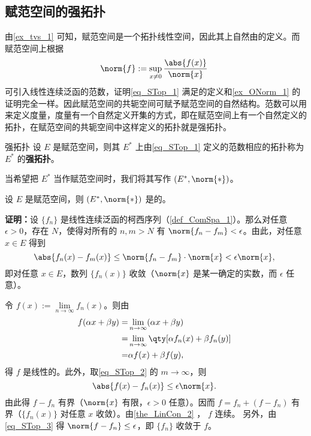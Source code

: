 
\subsection{赋范空间的强拓扑}

由\autoref{ex_tvs_1} 可知，赋范空间是一个拓扑线性空间，因此其上自然由的定义。而赋范空间上根据
\begin{equation}\label{eq_STop_1}
\norm{f}:=\sup_{x\neq0}\frac{\abs{f(x)}}{\norm{x}}~
\end{equation}
可引入线性连续泛函的范数，证明\autoref{eq_STop_1} 满足的定义和\autoref{ex_ONorm_1} 的证明完全一样。因此赋范空间的共轭空间可赋予赋范空间的自然结构。范数可以用来定义度量，度量有一个自然定义开集的方式，即在赋范空间上有一个自然定义的拓扑，在赋范空间的共轭空间中这样定义的拓扑就是强拓扑。
\begin{definition}{强拓扑}
设 $E$ 是赋范空间，则其 $E^*$ 上由\autoref{eq_STop_1} 定义的范数相应的拓扑称为 $E^*$ 的\textbf{强拓扑}。
\end{definition}

当希望把 $E^*$ 当作赋范空间时，我们将其写作 $(E^*,\norm{*})$。

\begin{theorem}{}
设 $E$ 是赋范空间，则 $(E^*,\norm{*})$ 是的。
\end{theorem}

\textbf{证明：}设 $\{f_n\}$ 是线性连续泛函的柯西序列（\autoref{def_ComSpa_1}）。那么对任意 $\epsilon>0$，存在 $N$，使得对所有的 $n,m>N$ 有 $\norm{f_n-f_m}<\epsilon$。由此，对任意 $x\in E$ 得到
\begin{equation}\label{eq_STop_2}
\abs{f_n(x)-f_m(x)}\leq\norm{f_n-f_m}\cdot\norm{x}<\epsilon\norm{x},~
\end{equation}
即对任意 $x\in E$，数列 $\{f_n(x)\}$ 收敛（$\norm{x}$ 是某一确定的实数，而 $\epsilon$ 任意）。

令 $f(x):=\lim\limits_{n\rightarrow\infty}f_n(x)$。则由
\begin{equation}
\begin{aligned}
f(\alpha x+\beta y)=&\lim_{n\rightarrow\infty}(\alpha x+\beta y)\\
=&\lim_{n\rightarrow\infty}\qty[\alpha f_n(x)+\beta f_n(y)]\\
=&\alpha f(x)+\beta f(y),
\end{aligned}~
\end{equation}
得 $f$ 是线性的。此外，取\autoref{eq_STop_2} 的 $m\rightarrow\infty$，则 
\begin{equation}\label{eq_STop_3}
\abs{f(x)-f_n(x)}\leq \epsilon\norm{x}.~
\end{equation}
由此得 $f-f_n$ 有界（$\norm{x}$ 有限，$\epsilon>0$ 任意）。因而 $f=f_n+(f-f_n)$ 有界（$\{f_n(x)\}$ 对任意 $x$ 收敛）。由\autoref{the_LinCon_2} ， $f$ 连续。 另外，由\autoref{eq_STop_3} 得 $\norm{f-f_n}\leq\epsilon$，即 $\{f_n\}$ 收敛于 $f$。


